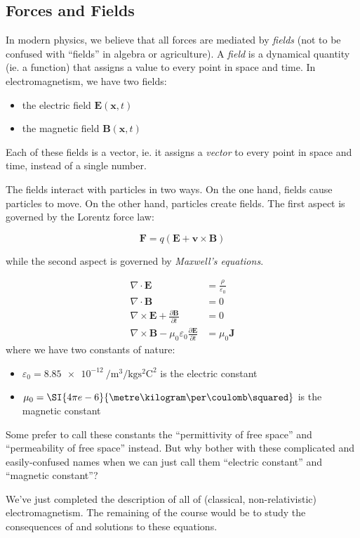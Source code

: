 \documentclass[a4paper]{article}
\begin{document}
\subsection{Forces and Fields}
In modern physics, we believe that all forces are mediated by \emph{fields} (not to be confused with ``fields'' in algebra or agriculture). A \emph{field} is a dynamical quantity (ie. a function) that assigns a value to every point in space and time. In electromagnetism, we have two fields:
\begin{itemize}
  \item the electric field $\mathbf{E}(\mathbf{x}, t)$
  \item the magnetic field $\mathbf{B}(\mathbf{x}, t)$
\end{itemize}
Each of these fields is a vector, ie. it assigns a \emph{vector} to every point in space and time, instead of a single number.

The fields interact with particles in two ways. On the one hand, fields cause particles to move. On the other hand, particles create fields. The first aspect is governed by the Lorentz force law:
\begin{law}
\[
  \mathbf{F} = q(\mathbf{E} + \mathbf{v}\times \mathbf{B})
\]
\end{law}
\noindent while the second aspect is governed by \emph{Maxwell's equations}.
\begin{law}
  \begin{align*}
    \nabla \cdot \mathbf{E} &= \frac{\rho}{\varepsilon_0}\\
    \nabla \cdot \mathbf{B} &= 0\\
    \nabla \times \mathbf{E} +\frac{\partial \mathbf{B}}{\partial t} &= 0\\
    \nabla \times \mathbf{B} - \mu_0\varepsilon_0 \frac{\partial \mathbf{E}}{\partial t} &= \mu_0 \mathbf{J}
  \end{align*}
  where we have two constants of nature:
  \begin{itemize}
    \item $\varepsilon_0 = \SI{8.85e-12}{\per\metre\cubed\per\kilogram\s\squared\coulomb\squared}$ is the electric constant
    \item $\mu_0 = \SI{4\pi e-6}{\metre\kilogram\per\coulomb\squared}$ is the magnetic constant
  \end{itemize}
  Some prefer to call these constants the ``permittivity of free space'' and ``permeability of free space'' instead. But why bother with these complicated and easily-confused names when we can just call them ``electric constant'' and ``magnetic constant''?
\end{law}
We've just completed the description of all of (classical, non-relativistic) electromagnetism. The remaining of the course would be to study the consequences of and solutions to these equations.
\end{document}
